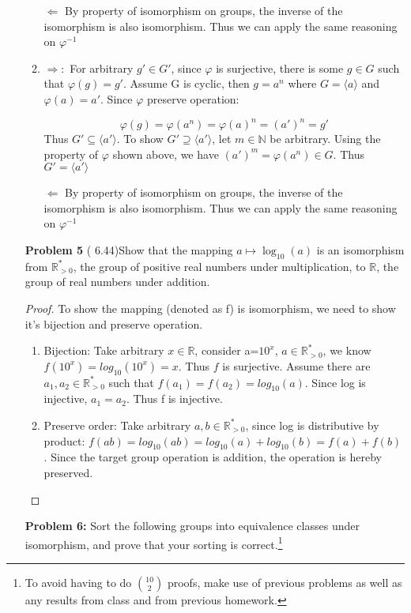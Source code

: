 \documentclass[11pt, oneside]{article}
\newcommand{\N}{\mathbb N}
\newcommand{\R}{\mathbb R}
\begin{document}
\begin{enumerate}
\begin{enumerate}
    $\Leftarrow$ By property of isomorphism on groups, the inverse of the isomorphism is also isomorphism. Thus we can apply the same reasoning on $\varphi^{-1}$
    \item$\Rightarrow: $ For arbitrary $g'\in G'$, since $\varphi$ is surjective, there is some $g\in G$ such that $\varphi(g)=g'$. Assume G is cyclic, then $g=a^n$ where $G=\langle a \rangle$ and $\varphi(a)=a'$. Since $\varphi$ preserve operation:
        
        \[\varphi(g)=\varphi(a^n)=\varphi(a)^n=(a')^n=g'\]
        Thus $G'\subseteq \langle a' \rangle $. To show $G'\supseteq \langle a' \rangle $, let $m\in \N$ be arbitrary. Using the property of $\varphi$ shown above, we have $(a')^m=\varphi(a^n)\in G$. Thus $G'=\langle a' \rangle$
        
        $\Leftarrow$ By property of isomorphism on groups, the inverse of the isomorphism is also isomorphism. Thus we can apply the same reasoning on $\varphi^{-1}$
    
    
\end{enumerate}


\newpage
\item[{\bf Problem 5}] ( 6.44)Show that the mapping $a\mapsto \log_{10}(a)$ is an isomorphism from $\R_{>0}^*$, the group of positive real numbers under multiplication, to $\R$, the group of real numbers under addition. 
\begin{proof}
To show the mapping (denoted as f) is isomorphism, we need to show it's bijection and preserve operation.
\begin{enumerate}
    \item Bijection: Take arbitrary $x\in \R$, consider a=$10^x$, $a\in \R_{>0}^* $, we know $f(10^x)=log_{10}(10^x)=x$. Thus $f$ is surjective. Assume there are $a_1, a_2\in \R_{>0}^*$ such that $f(a_1)=f(a_2)=log_{10}(a)$. Since log is injective, $a_1=a_2$. Thus f is injective. 
    \item Preserve order: Take arbitrary $a, b\in \R_{>0}^*$, since log is distributive by product: $f(ab)=log_{10}(ab)=log_{10}(a)+log_{10}(b)=f(a)+f(b)$. Since the target group operation is addition, the operation is hereby preserved. 
\end{enumerate}
\end{proof}





\newpage
\item[{\bf Problem 6:}] Sort the following groups into equivalence classes under isomorphism, and prove that your sorting is correct.\footnote{To avoid having to do $\binom{10}{2}$ proofs, make use of previous problems as well as any results from class and from previous homework.}


\end{enumerate}
\end{document}
